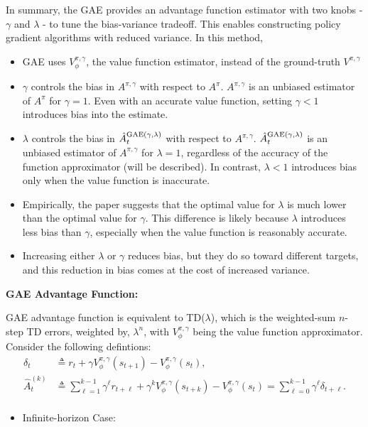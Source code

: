 \documentclass{article}
\begin{document}
In summary, the GAE provides an advantage function estimator with two knobs - $\gamma$ and $\lambda$ - to tune the bias-variance tradeoff. This enables constructing policy gradient algorithms with reduced variance.
In this method,
\begin{itemize}
    \item GAE uses $V_\phi^{\pi, \gamma}$, the value function estimator, instead of the ground-truth $V^{\pi,\gamma}$
    \item $\gamma$ controls the bias in $A^{\pi, \gamma}$ with respect to $A^\pi$. $A^{\pi, \gamma}$ is an unbiased estimator of $A^\pi$ for $\gamma =1$. Even with an accurate value function, setting $\gamma < 1$ introduces bias into the estimate. 
    \item $\lambda$ controls the bias in $\hat A_t^{\rm{GAE}(\gamma, \lambda)}$ with respect to $A^{\pi, \gamma}$. $\hat A_t^{\rm{GAE}(\gamma, \lambda)}$ is an unbiased estimator of $A^{\pi, \gamma}$ for $\lambda = 1$, regardless of the accuracy of the function approximator (will be described). In contrast, $\lambda < 1$ introduces bias only when the value function is inaccurate.
    \item Empirically, the paper suggests that the optimal value for $\lambda$ is much lower than the optimal value for $\gamma$. This difference is likely because $\lambda$ introduces less bias than $\gamma$, especially when the value function is reasonably accurate.
    \item Increasing either $\lambda$ or $\gamma$ reduces bias, but they do so toward different targets, and this reduction in bias comes at the cost of increased variance.
\end{itemize}

\textbf{GAE Advantage Function:}

GAE advantage function is equivalent to TD($\lambda$), which is the weighted-sum $n$-step TD errors, weighted by, $\lambda^n$, with $V_\phi^{\pi, \gamma}$ being the value function approximator. Consider the following defintions:
\begin{align*}
    \delta_t &\triangleq r_t + \gamma V_\phi^{\pi, \gamma}(s_{t+1}) - V_\phi^{\pi, \gamma}(s_t),\\
    \hat A_t^{(k)} &\triangleq \sum_{\ell=1}^{k-1} \gamma^{\ell} r_{t+\ell} + \gamma^k V_\phi^{\pi, \gamma}(s_{t+k}) - V_\phi^{\pi, \gamma}(s_t) = \sum_{\ell =0}^{k-1} \gamma^\ell \delta_{t+\ell}.\\
\end{align*}
\begin{itemize}
     \item Infinite-horizon Case:
\end{itemize}
\end{document}
